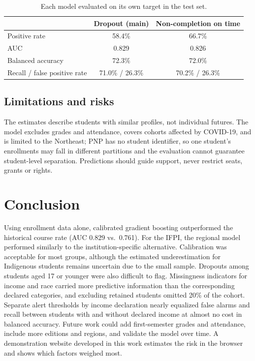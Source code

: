 \documentclass[12pt]{article}
\begin{document}
\begin{table}[ht]
\centering
\caption{Each model evaluated on its own target in the test set.}
\label{tab:retained}
\small
\begin{tabular}{lcc}
\toprule
 & Dropout (main) & Non-completion on time \\
\midrule
Positive rate & 58.4\% & 66.7\% \\
AUC & 0.829 & 0.826 \\
Balanced accuracy & 72.3\% & 72.0\% \\
Recall / false positive rate & 71.0\% / 26.3\% & 70.2\% / 26.3\% \\
\bottomrule
\end{tabular}
\end{table}

\subsection{Limitations and risks}

The estimates describe students with similar profiles, not individual futures.
The model excludes grades and attendance, covers cohorts affected by COVID-19, and is limited to the Northeast;
PNP has no student identifier, so one student's enrollments may fall in different partitions and the evaluation
cannot guarantee student-level separation.
Predictions should guide support, never restrict seats, grants or rights.

\section{Conclusion}

Using enrollment data alone, calibrated gradient boosting outperformed the historical course rate (AUC 0.829 vs.\ 0.761). For the IFPI, the regional model performed
similarly to the institution-specific alternative. Calibration was acceptable for most
groups, although the estimated underestimation for Indigenous students remains uncertain due to the small
sample. Dropouts among students aged 17 or younger were also difficult to flag. Missingness indicators for income and race carried more predictive information than the corresponding declared
categories, and excluding retained students omitted 20\% of the cohort. Separate alert thresholds by income declaration nearly equalized false alarms and recall between students with and without declared income at almost no cost in balanced accuracy. Future work could add
first-semester grades and attendance, include more editions and regions, and validate the model over time. A demonstration website developed in this work estimates the risk in the browser and
shows which factors weighed most.
\end{document}
